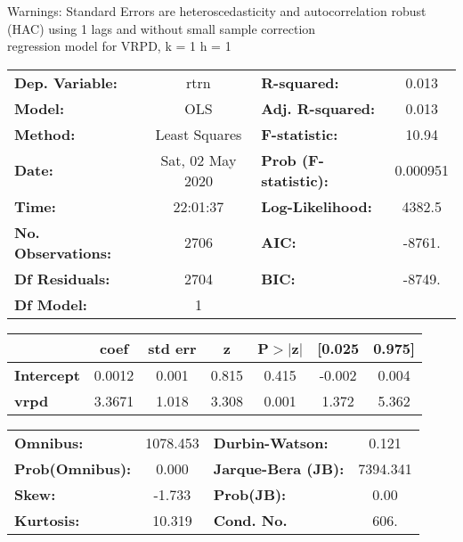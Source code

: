 Warnings: \newline
 [1] Standard Errors are heteroscedasticity and autocorrelation robust (HAC) using 1 lags and without small sample correction\\ 

regression model for VRPD, k = 1 h = 1\begin{center}
\begin{tabular}{lclc}
\toprule
\textbf{Dep. Variable:}    &       rtrn       & \textbf{  R-squared:         } &     0.013   \\
\textbf{Model:}            &       OLS        & \textbf{  Adj. R-squared:    } &     0.013   \\
\textbf{Method:}           &  Least Squares   & \textbf{  F-statistic:       } &     10.94   \\
\textbf{Date:}             & Sat, 02 May 2020 & \textbf{  Prob (F-statistic):} &  0.000951   \\
\textbf{Time:}             &     22:01:37     & \textbf{  Log-Likelihood:    } &    4382.5   \\
\textbf{No. Observations:} &        2706      & \textbf{  AIC:               } &    -8761.   \\
\textbf{Df Residuals:}     &        2704      & \textbf{  BIC:               } &    -8749.   \\
\textbf{Df Model:}         &           1      & \textbf{                     } &             \\
\bottomrule
\end{tabular}
\begin{tabular}{lcccccc}
                   & \textbf{coef} & \textbf{std err} & \textbf{z} & \textbf{P$> |$z$|$} & \textbf{[0.025} & \textbf{0.975]}  \\
\midrule
\textbf{Intercept} &       0.0012  &        0.001     &     0.815  &         0.415        &       -0.002    &        0.004     \\
\textbf{vrpd}      &       3.3671  &        1.018     &     3.308  &         0.001        &        1.372    &        5.362     \\
\bottomrule
\end{tabular}
\begin{tabular}{lclc}
\textbf{Omnibus:}       & 1078.453 & \textbf{  Durbin-Watson:     } &    0.121  \\
\textbf{Prob(Omnibus):} &   0.000  & \textbf{  Jarque-Bera (JB):  } & 7394.341  \\
\textbf{Skew:}          &  -1.733  & \textbf{  Prob(JB):          } &     0.00  \\
\textbf{Kurtosis:}      &  10.319  & \textbf{  Cond. No.          } &     606.  \\
\bottomrule
\end{tabular}
\end{center}


